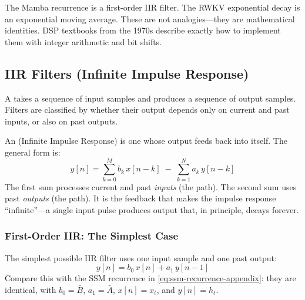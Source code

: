 \begin{keyinsight}
The Mamba recurrence is a first-order IIR filter.
The RWKV exponential decay is an exponential moving average.
These are not analogies---they are mathematical identities.
DSP textbooks from the 1970s describe exactly how to implement
them with integer arithmetic and bit shifts.
\end{keyinsight}

\subsection{IIR Filters (Infinite Impulse Response)}
\label{sec:dsp-iir}

A  takes a sequence of input samples and
produces a sequence of output samples. Filters are classified by
whether their output depends only on current and past inputs, or also
on past outputs.

An  (Infinite Impulse Response) is one whose output
feeds back into itself. The general form is:
%
\begin{equation}
  y[n] = \sum_{k=0}^{M} b_k \, x[n-k]
         \;-\; \sum_{k=1}^{N} a_k \, y[n-k]
  \label{eq:iir-general}
\end{equation}
%
The first sum processes current and past \emph{inputs} (the
 path). The second sum uses past \emph{outputs}
(the  path). It is the feedback that makes the
impulse response ``infinite''---a single input pulse produces output
that, in principle, decays forever.

\subsubsection{First-Order IIR: The Simplest Case}

The simplest possible IIR filter uses one input sample and one past
output:
%
\begin{equation}
  y[n] = b_0 \, x[n] + a_1 \, y[n-1]
  \label{eq:iir-first-order}
\end{equation}
%
Compare this with the SSM recurrence in \cref{eq:ssm-recurrence-appendix}:
they are identical, with $b_0 = \bar{B}$, $a_1 = \bar{A}$,
$x[n] = x_t$, and $y[n] = h_t$.

